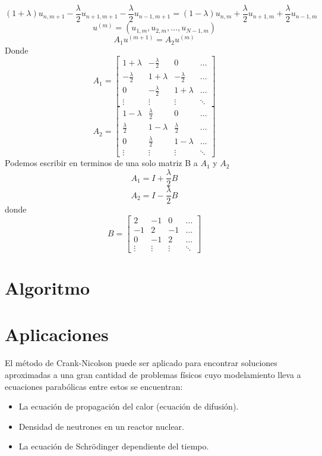 \documentclass[11pt]{article} %
\begin{document}
$$(1+\lambda)u_{n,m+1}-\frac{\lambda}{2}u_{n+1,m+1}-\frac{\lambda}{2}u_{n-1,m+1}=(1-\lambda)u_{n,m}+\frac{\lambda}{2}u_{n+1,m}+\frac{\lambda}{2}u_{n-1,m}$$
$$u^{(m)}=(u_{1,m},u_{2,m},\ldots,u_{N-1,m})$$
$$A_1u^{(m+1)}=A_2u^{(m)}$$
Donde
$$
A_1=
\begin{bmatrix}
  1+\lambda  & -\frac{\lambda}{2} & 0 & \ldots\\ 
 -\frac{\lambda}{2} & 1+\lambda & -\frac{\lambda}{2} & \ldots\\ 
 0 & -\frac{\lambda}{2} & 1+\lambda & \ldots\\ 
 \vdots & \vdots & \vdots & \ddots 
\end{bmatrix}
$$
$$
A_2=
\begin{bmatrix}
 1-\lambda  & \frac{\lambda}{2} & 0 & \ldots\\ 
 \frac{\lambda}{2} & 1-\lambda & \frac{\lambda}{2} & \ldots\\ 
 0 & \frac{\lambda}{2} & 1-\lambda & \ldots\\ 
 \vdots & \vdots & \vdots & \ddots 
\end{bmatrix}
$$
Podemos escribir en terminos de una solo matriz B a $A_1$ y $A_2$
$$
A_1=I+\frac{\lambda}{2}B
$$
$$
A_2=I-\frac{\lambda}{2}B
$$
donde
$$
B=
\begin{bmatrix}
 2  & -1 & 0 & \ldots\\ 
 -1 & 2 & -1 & \ldots\\ 
 0 & -1 & 2 & \ldots\\ 
 \vdots & \vdots & \vdots & \ddots 
\end{bmatrix}
$$



\section*{Algoritmo}


\section*{Aplicaciones}
El método de Crank-Nicolson puede ser aplicado para encontrar soluciones aproximadas a una gran cantidad de problemas físicos cuyo modelamiento lleva a ecuaciones parabólicas entre estos se encuentran:  
\begin{itemize}
    \item La ecuación de propagación del calor (ecuación de difusión).
    \item Densidad de neutrones en un reactor nuclear.
    \item La ecuación de Schrödinger dependiente del tiempo.
\end{itemize}






\end{document}
